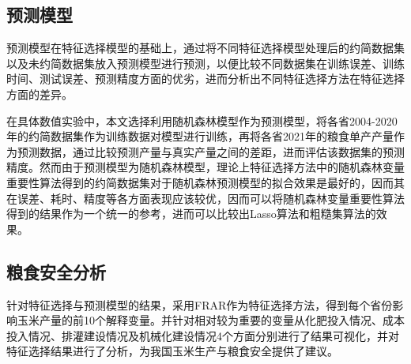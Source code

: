 \subsection{预测模型}
预测模型在特征选择模型的基础上，通过将不同特征选择模型处理后的约简数据集以及未约简数据集放入预测模型进行预测，以便比较不同数据集在训练误差、训练时间、测试误差、预测精度方面的优劣，进而分析出不同特征选择方法在特征选择方面的差异。

在具体数值实验中，本文选择利用随机森林模型作为预测模型，将各省2004-2020年的约简数据集作为训练数据对模型进行训练，再将各省2021年的粮食单产产量作为预测数据，通过比较预测产量与真实产量之间的差距，进而评估该数据集的预测精度。然而由于预测模型为随机森林模型，理论上特征选择方法中的随机森林变量重要性算法得到的约简数据集对于随机森林预测模型的拟合效果是最好的，因而其在误差、耗时、精度等各方面表现应该较优，因而可以将随机森林变量重要性算法得到的结果作为一个统一的参考，进而可以比较出Lasso算法和粗糙集算法的效果。

\subsection{粮食安全分析}

针对特征选择与预测模型的结果，采用FRAR作为特征选择方法，得到每个省份影响玉米产量的前10个解释变量。并针对相对较为重要的变量从化肥投入情况、成本投入情况、排灌建设情况及机械化建设情况4个方面分别进行了结果可视化，并对特征选择结果进行了分析，为我国玉米生产与粮食安全提供了建议。




